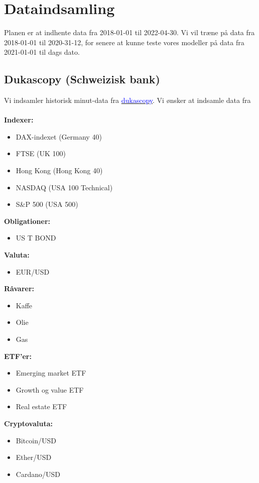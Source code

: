 \documentclass[a4paper,danish,12pt]{article}
\date{\displaydate{date}}
\begin{document}
\tableofcontents
\newpage




\section{Dataindsamling}
Planen er at indhente data fra 2018-01-01 til 2022-04-30. Vi vil træne på data fra 2018-01-01 til 2020-31-12, for senere at kunne teste vores modeller på data fra 2021-01-01 til dags dato.

\subsection*{Dukascopy (Schweizisk bank)}
Vi indsamler historisk minut-data fra \href{https://www.dukascopy.com/swiss/english/marketwatch/historical/}{\textcolor{blue}{dukascopy}}. Vi ønsker at indsamle data fra\\
\\
\textbf{Indexer:}
\begin{itemize}
\item DAX-indexet (Germany 40)
\item FTSE (UK 100)
\item Hong Kong (Hong Kong 40)
\item NASDAQ (USA 100 Technical)
\item S\&P 500 (USA 500)
\end{itemize}
\textbf{Obligationer:}
\begin{itemize}
\item US T BOND
\end{itemize}
\textbf{Valuta:}
\begin{itemize}
\item EUR/USD
\end{itemize}
\textbf{Råvarer:}
\begin{itemize}
\item Kaffe
\item Olie
\item Gas
\end{itemize}
\textbf{ETF'er:}
\begin{itemize}
\item Emerging market ETF
\item Growth og value ETF
\item Real estate ETF
\end{itemize}
\textbf{Cryptovaluta:}
\begin{itemize}
\item Bitcoin/USD
\item Ether/USD
\item Cardano/USD
\end{itemize}
\end{document}
